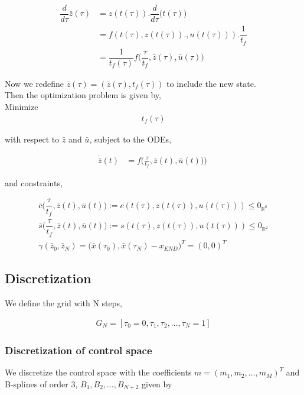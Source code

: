 \documentclass{article}
\begin{document}
\begin{align*}
    \dfrac{d}{d\tau}\bar{z}(\tau) &= \dot{z}(t(\tau)). \dfrac{d}{d\tau}({t(\tau))}\\
    & = f(t(\tau), z(t(\tau)). , u(t(\tau))). \dfrac{1}{t_f} \\
    &= \dfrac{1}{t_f(\tau)}f\big(\dfrac{\tau}{t_f}, \bar{z}(\tau), \bar{u}(\tau)\big) 
\end{align*}

Now we redefine \(\bar{z}(\tau) = (\bar{z}(\tau), t_f(\tau))\) to include the new state.\\

Then the optimization problem is given by,\\

Minimize
\begin{align*}
    t_f(\tau)
\end{align*}
 
with respect to \(\bar{z}\) and \(\bar{u}\),
subject to the ODEs,

\begin{align*}
    \dot{\bar{z}}(t) &= f\bigg(\frac{\tau}{t_f},\bar{z}(t),\bar{u}(t))\bigg)\
\end{align*}

and constraints,

\begin{align*}
    \bar{c} \bigg(\dfrac{\tau}{t_f},\bar{z}(t),\bar{u}(t)\bigg) := c(t(\tau), z(t(\tau)) , u(t(\tau))) \leq 0_{\mathbb{R}^8}\\
    \bar{s} \bigg(\dfrac{\tau}{t_f},\bar{z}(t),\bar{u}(t)\bigg) := s(t(\tau), z(t(\tau)) , u(t(\tau))) \leq 0_{\mathbb{R}^2}\\
    \gamma(\bar{z}_0, \bar{z}_N) = \big(\bar{x}(\tau_0), \bar{x}({\tau_N})-x_{END})^T = (0, 0)^T
\end{align*}

\subsection{Discretization}
We define the grid with N steps,

\begin{align*}
G_N = [\tau_0 = 0, \tau_1, \tau_2, \dots, \tau_N = 1]
\end{align*}

\subsubsection{Discretization of control space}
We discretize the control space with the coefficients \( m = (m_1, m_2, \dots, m_M)^T \) and B-splines of order 3, \( B_1, B_2, \dots, B_{N+2}\) given by
\end{document}
